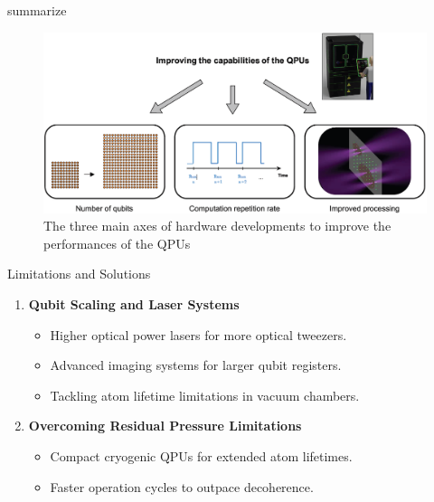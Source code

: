 \documentclass[18 pt]{beamer}
\begin{document}
\begin{frame}{summarize}
  \begin{figure}
    \centering
    \includegraphics[width=\textwidth]{IMG/improve.png}
    \caption{The three main axes of hardware developments to improve the performances of the QPUs}
  \end{figure}
\end{frame}
\begin{frame}{Limitations and Solutions}
  \begin{enumerate}
    \item \textbf{Qubit Scaling and Laser Systems}
      \begin{itemize}[itemsep=5pt]
        \item Higher optical power lasers for more optical tweezers.
        \item Advanced imaging systems for larger qubit registers.
        \item Tackling atom lifetime limitations in vacuum chambers.
      \end{itemize}
    \item \textbf{Overcoming Residual Pressure Limitations}
      \begin{itemize}[itemsep=5pt]
        \item Compact cryogenic QPUs for extended atom lifetimes.
        \item Faster operation cycles to outpace decoherence.
      \end{itemize}
  \end{enumerate}
\end{frame}
\end{document}
